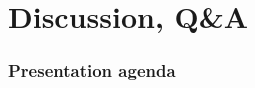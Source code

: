\section{Discussion, Q\&A}
\begin{frame}
\frametitle{Presentation agenda}
\tableofcontents[currentsection]
\end{frame}
